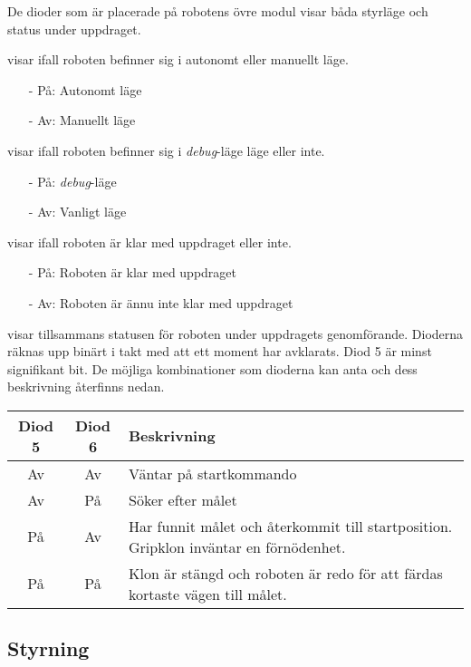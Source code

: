 \documentclass[11pt]{article}
\begin{document}
De dioder som är placerade på robotens övre modul visar båda styrläge och status under uppdraget.
\begin{description}[style=unboxed, leftmargin=0cm]
  \item[Diod 1] visar ifall roboten befinner sig i autonomt eller manuellt läge. 
    \begin{itemize}
      \setlength\itemsep{-0.5em}
      \item[-] På: Autonomt läge 
      \item[-] Av: Manuellt läge
    \end{itemize}
  \item[Diod 2] visar ifall roboten befinner sig i \textit{debug}-läge läge eller inte.
    \begin{itemize}
      \setlength\itemsep{-0.5em}
      \item[-] På: \textit{debug}-läge
      \item[-] Av: Vanligt läge
    \end{itemize}
  \item[Diod 3] visar ifall roboten är klar med uppdraget eller inte.
    \begin{itemize}
      \setlength\itemsep{-0.5em}
      \item[-] På: Roboten är klar med uppdraget
      \item[-] Av: Roboten är ännu inte klar med uppdraget
    \end{itemize}
  \item[Diod 4 och 5] visar tillsammans statusen för roboten under uppdragets genomförande. Dioderna räknas upp binärt i takt med att ett moment har avklarats. Diod 5 är minst signifikant bit. De möjliga kombinationer som dioderna kan anta och dess beskrivning återfinns nedan.
    \hspace{1em}
    \begin{tabular}{c c p{6cm}}
	Diod 5 & Diod 6 & Beskrivning \\ \hline
	Av & Av & Väntar på startkommando \\
	Av & På & Söker efter målet \\
	På & Av & Har funnit målet och återkommit till startposition. Gripklon inväntar en förnödenhet. \\
	På & På & Klon är stängd och roboten är redo för att färdas kortaste vägen till målet.

    \end{tabular}
\end{description}


\subsection{Styrning}
\end{document}
